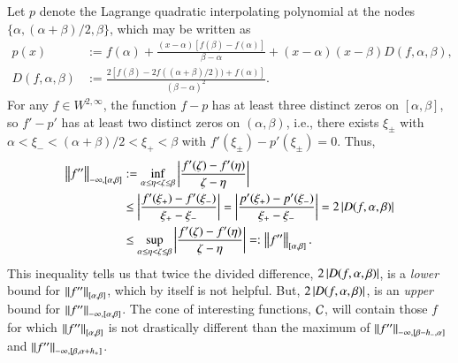 \documentclass[review]{elsarticle}
\theoremstyle{definition}
\renewcommand{\cw}{W}
\begin{document}
Let $p$ denote the Lagrange quadratic interpolating polynomial at the nodes
$\{\alpha, (\alpha + \beta)/2, \beta\}$, which may be written as
\begin{align}
\nonumber
   p(x) & := f(\alpha) + \frac{(x-\alpha)[f(\beta) - f(\alpha)]}{\beta - \alpha}  + (x-\alpha)(x-\beta) D(f,\alpha,\beta), 
\\ D(f,\alpha,\beta) &:= \frac{2[f(\beta) - 2f((\alpha + \beta)/2)) + f(\alpha)]}{(\beta - \alpha)^2}. \label{divdiffdef}
\end{align}
For any $f \in \cw^{2,\infty}$, the function $f - p$ has at least three distinct
zeros on $[\alpha,\beta]$, so $f' - p'$ has at least two distinct zeros on
$(\alpha,\beta)$, i.e., there exists $\xi_\pm$ with $\alpha < \xi_- < (\alpha +
\beta)/2 < \xi_+ < \beta$ with $f'(\xi_\pm) - p'(\xi_{\pm}) = 0$. Thus,
\begin{align} \label{NDDbdm}
     \norm[-\infty,{[\alpha,\beta]}]{f''} 
   & := \inf_{\alpha \le \eta < \zeta \le \beta} \abs{\frac{f'(\zeta) - f'(\eta)}{\zeta - \eta}} \nonumber
\\ & \le \abs{\frac{f'(\xi_+) - f'(\xi_-)}{\xi_+ - \xi_-}} 
   = \abs{\frac{p'(\xi_+) - p'(\xi_-)}{\xi_+ - \xi_-}} = 2 \abs{D(f,\alpha,\beta)}  \nonumber
\\ & \le \sup_{\alpha \le \eta < \zeta \le \beta} \abs{\frac{f'(\zeta) - f'(\eta)}{\zeta - \eta}} =: \norm[{[\alpha,\beta]}]{f''}.
\end{align}
This inequality tells us that twice the divided difference,
$2\abs{D(f,\alpha,\beta)}$, is a \emph{lower} bound for
$\norm[{[\alpha,\beta]}]{f''}$, which by itself is not helpful. But,
$2\abs{D(f,\alpha,\beta)}$, is an \emph{upper} bound for
$\norm[-\infty,{[\alpha,\beta]}]{f''}$. The cone of interesting functions,
$\cc$, will contain those $f$ for which $\norm[{[\alpha,\beta]}]{f''}$ is not
drastically different than the maximum of $\norm[-\infty,{[\beta - h_-,
\alpha]}]{f''}$ and $\norm[-\infty,{[\beta, \alpha+ h_+]}]{f''}$.
\end{document}
